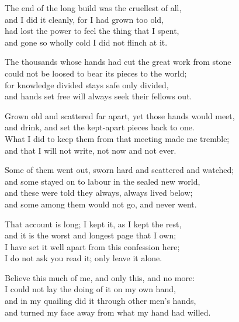 \begin{founder}
\ornament

The end of the long build was the cruellest of all,\\
and I did it cleanly, for I had grown too old,\\
had lost the power to feel the thing that I spent,\\
and gone so wholly cold I did not flinch at it.\\
\medskip

The thousands whose hands had cut the great work from stone\\
could not be loosed to bear its pieces to the world;\\
for knowledge divided stays safe only divided,\\
and hands set free will always seek their fellows out.\\
\medskip

Grown old and scattered far apart, yet those hands would meet,\\
and drink, and set the kept-apart pieces back to one.\\
What I did to keep them from that meeting made me tremble;\\
and that I will not write, not now and not ever.\\
\medskip

Some of them went out, sworn hard and scattered and watched;\\
and some stayed on to labour in the sealed new world,\\
and these were told they always, always lived below;\\
and some among them would not go, and never went.\\
\medskip

That account is long; I kept it, as I kept the rest,\\
and it is the worst and longest page that I own;\\
I have set it well apart from this confession here;\\
I do not ask you read it; only leave it alone.\\
\medskip

Believe this much of me, and only this, and no more:\\
I could not lay the doing of it on my own hand,\\
and in my quailing did it through other men's hands,\\
and turned my face away from what my hand had willed.\\
\medskip


\end{founder}
